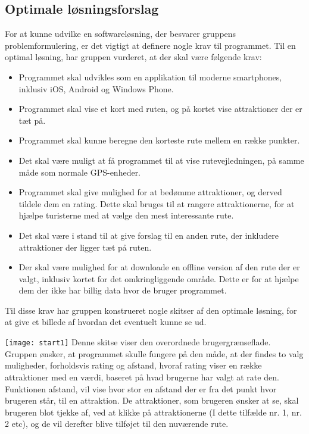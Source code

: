 \subsection{Optimale løsningsforslag}
For at kunne udvilke en softwareløsning, der besvarer gruppens problemformulering, er det vigtigt at definere nogle krav til programmet. Til en optimal løsning, har gruppen vurderet, at der skal være følgende krav:
\begin{itemize}
	\item Programmet skal udvikles som en applikation til moderne smartphones, inklusiv iOS, Android og Windows Phone. 
	\item Programmet skal vise et kort med ruten, og på kortet vise attraktioner der er tæt på. 
	\item Programmet skal kunne beregne den korteste rute mellem en række punkter.
	\item Det skal være muligt at få programmet til at vise rutevejledningen, på samme måde som normale GPS-enheder. 
	\item Programmet skal give mulighed for at bedømme attraktioner, og derved tildele dem en rating. Dette skal bruges til at rangere attraktionerne, for at hjælpe turisterne med at vælge den mest interessante rute. 
	\item Det skal være i stand til at give forslag til en anden rute, der inkludere attraktioner der ligger tæt på ruten.
	\item Der skal være mulighed for at downloade en offline version af den rute der er valgt, inklusiv kortet for det omkringliggende område. Dette er for at hjælpe dem der ikke har billig data hvor de bruger programmet.
\end{itemize}
Til disse krav har gruppen konstrueret nogle skitser af den optimale løsning, for at give et billede af hvordan det eventuelt kunne se ud. \newline

\texttt{[image: start1]} \newline
Denne skitse viser den overordnede brugergrænseflade. Gruppen ønsker, at programmet skulle fungere på den måde, at der findes to valg muligheder, forholdsvis rating og afstand, hvoraf rating viser en række attraktioner med en værdi, baseret på hvad brugerne har valgt at rate den. Funktionen afstand, vil vise hvor stor en afstand der er fra det punkt hvor brugeren står, til en attraktion. De attraktioner, som brugeren ønsker at se, skal brugeren blot tjekke af, ved at klikke på attraktionerne (I dette tilfælde nr. 1, nr. 2 etc), og de vil derefter blive tilføjet til den nuværende rute. 


